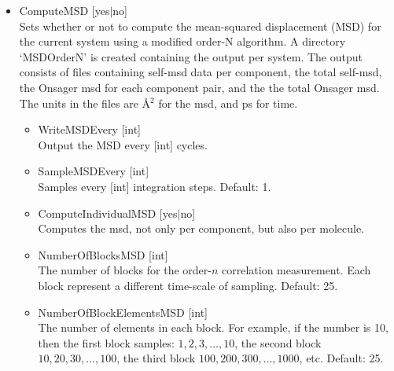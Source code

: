 \begin{itemize}
\item{ComputeMSD [yes$|$no]}\\
Sets whether or not to compute the mean-squared displacement (MSD) for the current system using a modified order-N algorithm.
A directory `MSDOrderN' is created containing the output per system. The output consists of files containing self-msd data per
component, the total self-msd, the Onsager msd for each component pair, and the the total Onsager msd.
The units in the files are \AA$^2$ for the msd, and ps for time.
  \begin{itemize}
    \item{WriteMSDEvery [int]}\\
     Output the MSD every [int] cycles.
    \item{SampleMSDEvery [int]}\\
    Samples every [int] integration steps. Default: 1.
    \item{ComputeIndividualMSD [yes$|$no]}\\
    Computes the msd, not only per component, but also per molecule.
    \item{NumberOfBlocksMSD [int]}\\
    The  number of blocks for the order-$n$ correlation measurement. Each block represent a different time-scale of sampling. Default: 25.
    \item{NumberOfBlockElementsMSD [int]}\\
    The number of elements in each block. For example, if the number is 10, then the first block samples: $1,2,3,\dots,10$, the second block
    $10,20,30,\dots,100$, the third block $100,200,300,\dots,1000$, etc. Default: 25.
   \end{itemize}


\end{itemize}
